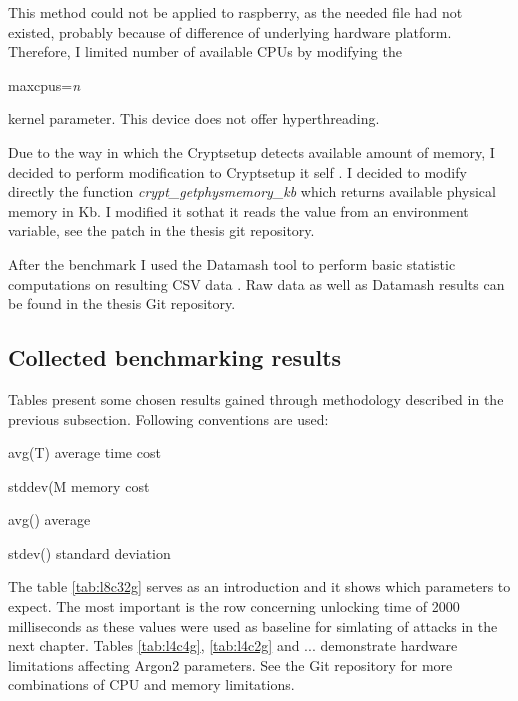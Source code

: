 \documentclass[nolof]{fithesis3}
\begin{document}
This method could not be applied to raspberry, as the needed file had not existed, probably because of difference of underlying hardware platform. Therefore, I limited number of available CPUs by modifying the 
\begin{tt}
maxcpus=\emph{n}
\end{tt}
 kernel parameter. This device does not offer hyperthreading.

Due to the way in which the Cryptsetup detects available amount of memory, I decided to perform modification to Cryptsetup it self \parencite{cryptsetuputils}. I decided to modify directly the function \emph{crypt\_getphysmemory\_kb} which returns available physical memory in Kb. I modified it sothat it reads the value from an environment variable, see the patch in the thesis git repository.

After the benchmark I used the Datamash tool to perform basic statistic computations on resulting CSV data \parencite{datamash}. Raw data as well as Datamash results can be found in the thesis Git repository.

\FloatBarrier

\subsection{Collected benchmarking results}
Tables present some chosen results gained through methodology described in the previous subsection. Following conventions are used:

\begin{description}
\item{avg(T)} average time cost

\item{stddev(M} memory cost

\item{avg()} average

\item{stdev()} standard deviation
\end{description}

The table \ref{tab:l8c32g} serves as an introduction and it shows which parameters to expect. The most important is the row concerning unlocking time of 2000 milliseconds as these values were used as baseline for simlating of attacks in the next chapter. Tables \ref{tab:l4c4g}, \ref{tab:l4c2g} and ... demonstrate hardware limitations affecting Argon2 parameters. See the Git repository for more combinations of CPU and memory limitations.
\end{document}
